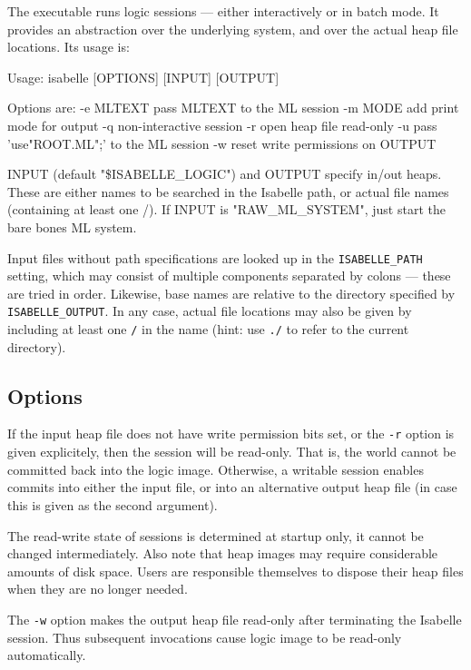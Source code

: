 The  executable runs logic sessions --- either
interactively or in batch mode. It provides an abstraction over the
underlying {\ML} system, and over the actual heap file locations. Its
usage is:
\begin{ttbox}
Usage: isabelle [OPTIONS] [INPUT] [OUTPUT]

  Options are:
    -e MLTEXT    pass MLTEXT to the ML session
    -m MODE      add print mode for output
    -q           non-interactive session
    -r           open heap file read-only
    -u           pass 'use"ROOT.ML";' to the ML session
    -w           reset write permissions on OUTPUT

  INPUT (default "\$ISABELLE_LOGIC") and OUTPUT specify in/out heaps.
  These are either names to be searched in the Isabelle path, or actual
  file names (containing at least one /).
  If INPUT is "RAW_ML_SYSTEM", just start the bare bones ML system.
\end{ttbox}
Input files without path specifications are looked up in the
\texttt{ISABELLE_PATH} setting, which may consist of multiple
components separated by colons --- these are tried in order.
Likewise, base names are relative to the directory specified by
\texttt{ISABELLE_OUTPUT}.  In any case, actual file locations may also
be given by including at least one \texttt{/} in the name (hint: use
\texttt{./} to refer to the current directory).


\subsection*{Options}

If the input heap file does not have write permission bits set, or the
\texttt{-r} option is given explicitely, then the session will be
read-only. That is, the {\ML} world cannot be committed back into the
logic image.  Otherwise, a writable session enables commits into
either the input file, or into an alternative output heap file (in
case this is given as the second argument).

The read-write state of sessions is determined at startup only, it
cannot be changed intermediately. Also note that heap images may
require considerable amounts of disk space. Users are responsible
themselves to dispose their heap files when they are no longer needed.

\medskip The \texttt{-w} option makes the output heap file read-only
after terminating the Isabelle session.  Thus subsequent invocations
cause logic image to be read-only automatically.

